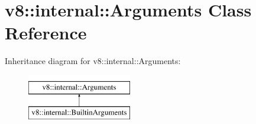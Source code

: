 \hypertarget{classv8_1_1internal_1_1Arguments}{}\section{v8\+:\+:internal\+:\+:Arguments Class Reference}
\label{classv8_1_1internal_1_1Arguments}
Inheritance diagram for v8\+:\+:internal\+:\+:Arguments\+:\begin{figure}[H]
\begin{center}
\leavevmode
\includegraphics[height=2.000000cm]{classv8_1_1internal_1_1Arguments}
\end{center}
\end{figure}
